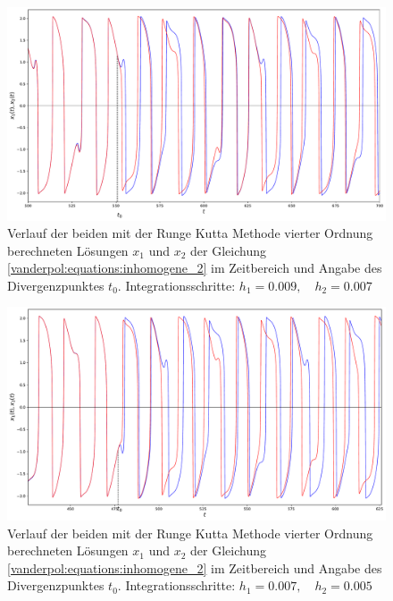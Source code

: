 \begin{figure}
\includegraphics[width=\textwidth]{papers/vanderpol/figures/RK_schritt_delta_2e-3_2.pdf}
\caption{Verlauf der beiden mit der Runge Kutta Methode vierter Ordnung berechneten Lösungen $x_1$ und $x_2$ der Gleichung \eqref{vanderpol:equations:inhomogene_2} im Zeitbereich und Angabe des Divergenzpunktes $t_0$. Integrationsschritte: $h_1 = 0.009, \quad h_2 = 0.007$\label{vanderpol:figures:RK_schritt_2e-3}}
\end{figure}

\begin{figure}
\includegraphics[width=\textwidth]{papers/vanderpol/figures/RK_schritt_delta_2e-3.pdf}
\caption{Verlauf der beiden mit der Runge Kutta Methode vierter Ordnung berechneten Lösungen $x_1$ und $x_2$ der Gleichung \eqref{vanderpol:equations:inhomogene_2} im Zeitbereich und Angabe des Divergenzpunktes $t_0$. Integrationsschritte: $h_1 = 0.007, \quad h_2 = 0.005$\label{vanderpol:figures:RK_schritt_2e-3_2}}
\end{figure}

